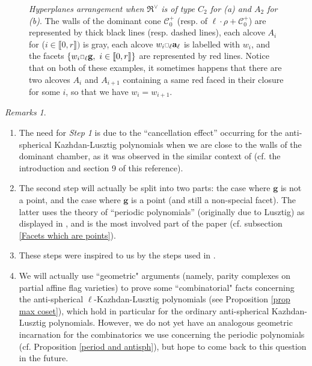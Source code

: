 \documentclass[11pt]{amsart}
\theoremstyle{plain}
\theoremstyle{remark}
\newtheorem{rems}[thm]{Remarks}
\newcommand{\car}{\mbox{\relsize{-5}$\Box$}}
\numberwithin{equation}{section}
\begin{document}
\begin{figure}[!h]
\begin{tabular}{c c}
\end{tabular}
	\caption{\textit{Hyperplanes arrangement when $\mathfrak{R}^\vee$  is of type $C_2$ for (a) and $A_2$ for (b)}. The walls of the dominant cone $\mathscr{C}_0^+$ (resp. of $\ell\cdot\rho+\mathscr{C}_0^+$) are represented by thick black lines (resp. dashed lines), each alcove $A_i$ for ($i\in\llbracket 0,r\rrbracket)$ is gray, each alcove $w_i\car_\ell\mathbf{a}_\ell$ is labelled with $w_i$, and the facets $\{w_i\car_\ell\mathbf{g},~i\in\llbracket 0,r\rrbracket\}$ are represented by red lines. Notice that on both of these examples, it sometimes happens that there are two alcoves $A_i$ and $A_{i+1}$ containing a same red faced in their closure for some $i$, so that we have $w_i=w_{i+1}$.}  \label{Affine hyperplanes C2}
\end{figure}



\begin{rems}\begin{enumerate}
    \item The need for \textit{Step 1} is due to the ``cancellation effect'' occurring for the anti-spherical Kazhdan-Lusztig polynomials when we are close to the walls of the dominant chamber, as it was observed in the similar context of \cite{andersen1986inversion} (cf. the introduction and section 9 of this reference).
    \item The second step will actually be split into two parts: the case where $\mathbf{g}$ is not a point, and the case where $\mathbf{g}$ is a point (and still a non-special facet). The latter uses the theory of ``periodic polynomials'' (originally due to Lusztig) as displayed in \cite{Soergel1997KazhdanLusztigPA}, and is the most involved part of the paper (cf. subsection \ref{Facets which are points}).
    \item These steps were inspired to us by the steps used in \cite[§2]{article}.
    \item We will actually use ``geometric" arguments (namely, parity complexes on partial affine flag varieties) to prove some ``combinatorial" facts concerning the anti-spherical $\ell$-Kazhdan-Lusztig polynomials (see Proposition \ref{prop max coset}), which hold in particular for the ordinary anti-spherical Kazhdan-Lusztig polynomials. However, we do not yet have an analogous geometric incarnation for the combinatorics we use concerning the periodic polynomials (cf. Proposition \ref{period and antisph}), but hope to come back to this question in the future.
\end{enumerate}
 \end{rems}	 
\end{document}
